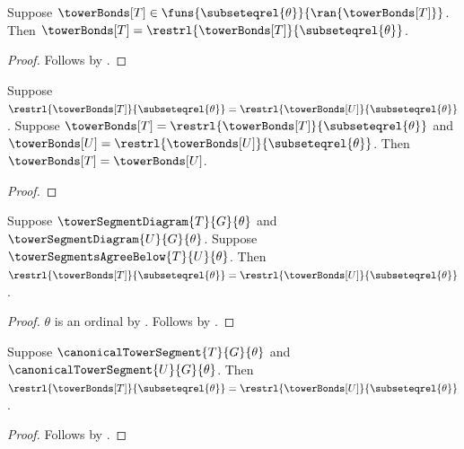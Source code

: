 \begin{proposition}\label{tower_bond_family_full_restriction}
    Suppose $\towerBonds[T]\in
        \funs{\subseteqrel{\theta}}{\ran{\towerBonds[T]}}$.
    Then $\towerBonds[T]=
        \restrl{\towerBonds[T]}{\subseteqrel{\theta}}$.
\end{proposition}
\begin{proof}
    Follows by
        .
\end{proof}

\begin{proposition}\label{tower_bond_family_equality_from_restrictions}
    Suppose $\restrl{\towerBonds[T]}{\subseteqrel{\theta}}=
        \restrl{\towerBonds[U]}{\subseteqrel{\theta}}$.
    Suppose $\towerBonds[T]=
            \restrl{\towerBonds[T]}{\subseteqrel{\theta}}$ and
        $\towerBonds[U]=
            \restrl{\towerBonds[U]}{\subseteqrel{\theta}}$.
    Then $\towerBonds[T]=\towerBonds[U]$.
\end{proposition}
\begin{proof}
\end{proof}

\begin{proposition}\label{tower_agreement_full_bond_restrictions}
    Suppose $\towerSegmentDiagram{T}{G}{\theta}$ and
        $\towerSegmentDiagram{U}{G}{\theta}$.
    Suppose $\towerSegmentsAgreeBelow{T}{U}{\theta}$.
    Then $\restrl{\towerBonds[T]}{\subseteqrel{\theta}}=
        \restrl{\towerBonds[U]}{\subseteqrel{\theta}}$.
\end{proposition}
\begin{proof}
    $\theta$ is an ordinal by
        .
    Follows by
        .
\end{proof}

\begin{proposition}\label{canonical_tower_bond_restrictions_equal}
    Suppose $\canonicalTowerSegment{T}{G}{\theta}$ and
        $\canonicalTowerSegment{U}{G}{\theta}$.
    Then $\restrl{\towerBonds[T]}{\subseteqrel{\theta}}=
        \restrl{\towerBonds[U]}{\subseteqrel{\theta}}$.
\end{proposition}
\begin{proof}
    Follows by
        .
\end{proof}

